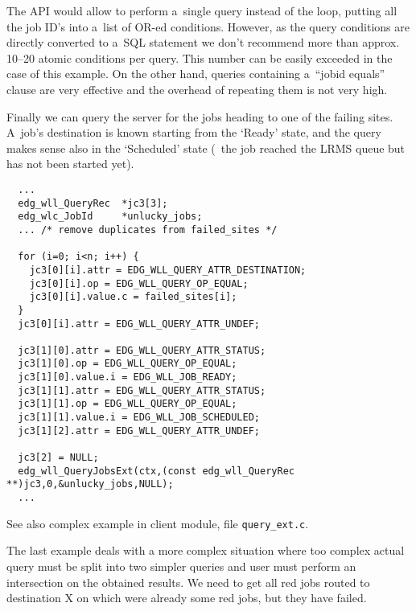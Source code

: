 The API would allow to perform a~single query instead of the loop,
putting all the job ID's into a~list of OR-ed conditions.
However, as the query conditions are directly converted to a~SQL statement
we don't recommend more than approx. 10--20 atomic conditions per query.
This number can be easily exceeded in the case of this example.
On the other hand, queries containing a~``jobid equals'' clause are very
effective and the overhead of repeating them is not very high.

Finally we can query the server for the jobs heading to one of the failing
sites.
A~job's destination is known starting from the `Ready' state,
and the query makes sense also in the `Scheduled' state (\ie\ the job reached
the LRMS queue but has not been started yet). 

\begin{verbatim}
  ...
  edg_wll_QueryRec  *jc3[3];
  edg_wlc_JobId     *unlucky_jobs;
  ... /* remove duplicates from failed_sites */

  for (i=0; i<n; i++) {
    jc3[0][i].attr = EDG_WLL_QUERY_ATTR_DESTINATION;
    jc3[0][i].op = EDG_WLL_QUERY_OP_EQUAL;
    jc3[0][i].value.c = failed_sites[i];
  }
  jc3[0][i].attr = EDG_WLL_QUERY_ATTR_UNDEF;

  jc3[1][0].attr = EDG_WLL_QUERY_ATTR_STATUS;
  jc3[1][0].op = EDG_WLL_QUERY_OP_EQUAL;
  jc3[1][0].value.i = EDG_WLL_JOB_READY;
  jc3[1][1].attr = EDG_WLL_QUERY_ATTR_STATUS;
  jc3[1][1].op = EDG_WLL_QUERY_OP_EQUAL;
  jc3[1][1].value.i = EDG_WLL_JOB_SCHEDULED;
  jc3[1][2].attr = EDG_WLL_QUERY_ATTR_UNDEF;

  jc3[2] = NULL;
  edg_wll_QueryJobsExt(ctx,(const edg_wll_QueryRec **)jc3,0,&unlucky_jobs,NULL);
  ...
\end{verbatim}

See also complex example in client module, file \texttt{query\_ext.c}.

\iffalse
The last example deals with a more complex situation where too complex actual
query must be
split into two simpler queries and user must perform an intersection
on the obtained results.
We need to get all red jobs routed to destination X on which were already some 
red jobs, but they have failed. 

